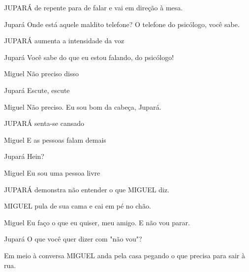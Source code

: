 \documentclass{screenplay}
\begin{document}
JUPARÁ de repente para de falar e vai em direção à mesa.

\begin{dialogue}{Jupará}
    Onde está aquele maldito telefone? O telefone do psicólogo, você sabe.
\end{dialogue}

JUPARÁ aumenta a intensidade da voz

\begin{dialogue}{Jupará}
    Você sabe do que eu estou falando, do psicólogo!
\end{dialogue}

\begin{dialogue}{Miguel}
    Não preciso disso
\end{dialogue}

\begin{dialogue}{Jupará}
    Escute, escute
\end{dialogue}

\begin{dialogue}{Miguel}
    Não preciso.  Eu sou bom da cabeça, Jupará.
\end{dialogue}

JUPARÁ senta-se cansado

\begin{dialogue}{Miguel}
    E as pessoas falam demais
\end{dialogue}

\begin{dialogue}{Jupará}
    Hein?
\end{dialogue}

\begin{dialogue}{Miguel}
    Eu sou uma pessoa livre
\end{dialogue}

JUPARÁ demonstra não entender o que MIGUEL diz.

MIGUEL pula de sua cama e cai em pé no chão.

\begin{dialogue}{Miguel}
    Eu faço o que eu quiser, meu amigo. E não vou parar.
\end{dialogue}

\begin{dialogue}{Jupará}
    O que você quer dizer com "não vou"?
\end{dialogue}

Em meio à conversa MIGUEL anda pela casa pegando o que precisa para sair à rua.
\end{document}
